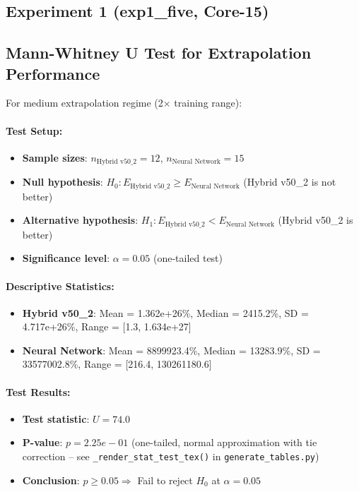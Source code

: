 \documentclass[twoside,11pt]{article}
\begin{document}
\subsection*{Experiment 1 (exp1\_five, Core-15)}

\subsection{Mann-Whitney U Test for Extrapolation Performance}

For medium extrapolation regime (2$\times$ training range):

\paragraph{Test Setup:}
\begin{itemize}
\item \textbf{Sample sizes}: $n_{\text{Hybrid v50\_2}} = 12$, $n_{\text{Neural Network}} = 15$
\item \textbf{Null hypothesis}: $H_0: E_{\text{Hybrid v50\_2}} \geq E_{\text{Neural Network}}$ (Hybrid v50\_2 is not better)
\item \textbf{Alternative hypothesis}: $H_1: E_{\text{Hybrid v50\_2}} < E_{\text{Neural Network}}$ (Hybrid v50\_2 is better)
\item \textbf{Significance level}: $\alpha = 0.05$ (one-tailed test)
\end{itemize}

\paragraph{Descriptive Statistics:}
\begin{itemize}
\item \textbf{Hybrid v50\_2}: Mean = 1.362e+26\%, Median = 2415.2\%, SD = 4.717e+26\%, Range = [1.3, 1.634e+27]
\item \textbf{Neural Network}: Mean = 8899923.4\%, Median = 13283.9\%, SD = 33577002.8\%, Range = [216.4, 130261180.6]
\end{itemize}

\paragraph{Test Results:}
\begin{itemize}
\item \textbf{Test statistic}: $U = 74.0$
\item \textbf{P-value}: $p = 2.25e-01$ (one-tailed, normal approximation with tie correction -- see \texttt{\_render\_stat\_test\_tex()} in \texttt{generate\_tables.py})
\item \textbf{Conclusion}: $p \geq 0.05 \Rightarrow$ Fail to reject $H_0$ at $\alpha = 0.05$
\end{itemize}
\end{document}

